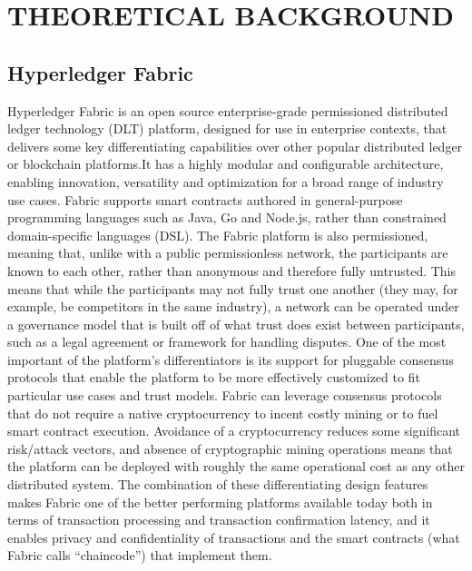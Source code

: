 \chapter{THEORETICAL BACKGROUND}

\section{Hyperledger Fabric}
Hyperledger Fabric is an open source enterprise-grade permissioned distributed ledger technology (DLT) platform, designed for use in enterprise contexts, that delivers some key differentiating capabilities over other popular distributed ledger or blockchain platforms.It has a highly modular and configurable architecture, enabling innovation, versatility and optimization for a broad range of industry use cases.\newline
Fabric supports smart contracts authored in general-purpose programming languages such as Java, Go and Node.js, rather than constrained domain-specific languages (DSL). \newline
The Fabric platform is also permissioned, meaning that, unlike with a public permissionless network, the participants are known to each other, rather than anonymous and therefore fully untrusted. This means that while the participants may not fully trust one another (they may, for example, be competitors in the same industry), a network can be operated under a governance model that is built off of what trust does exist between participants, such as a legal agreement or framework for handling disputes.\newline
One of the most important of the platform’s differentiators is its support for pluggable consensus protocols that enable the platform to be more effectively customized to fit particular use cases and trust models. 
Fabric can leverage consensus protocols that do not require a native cryptocurrency to incent costly mining or to fuel smart contract execution. Avoidance of a cryptocurrency reduces some significant risk/attack vectors, and absence of cryptographic mining operations means that the platform can be deployed with roughly the same operational cost as any other distributed system.\newline
The combination of these differentiating design features makes Fabric one of the better performing platforms available today both in terms of transaction processing and transaction confirmation latency, and it enables privacy and confidentiality of transactions and the smart contracts (what Fabric calls “chaincode”) that implement them.
